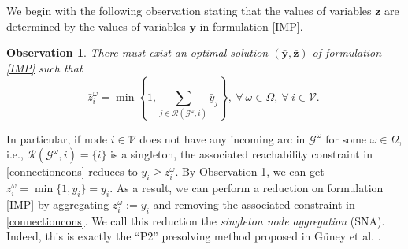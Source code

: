\documentclass[a4paper,10pt]{article}
\newcommand{\G}{\mathcal{G}}
\theoremstyle{plain}
\newtheorem{observation}[theorem]{Observation}
\begin{document}
	We begin with the following observation stating that the values of variables $\boldsymbol{z}$ are determined by the values of variables $\boldsymbol{y}$ in formulation \eqref{IMP}.
	\begin{observation}\label{projection_on_z}
		There must exist an optimal solution $(\bar{\boldsymbol{y}},\bar{\boldsymbol{z}})$ of formulation \eqref{IMP} such that
		\begin{equation}
			\bar{z}_i^{\omega}=\min\left\{1,\sum\limits_{j\in\mathcal{R}(\mathcal{G}^{\omega},i)}\bar{y}_j\right\},~ \forall~ \omega \in \Omega,~\forall~ i\in\mathcal{V}.~\label{projection_on_z_equation}
		\end{equation}
	\end{observation}
	\noindent In particular, if node $i\in\mathcal{V}$ does not have any incoming arc in $\mathcal{G}^{\omega}$ for some $\omega\in\Omega$, 
	i.e., $\mathcal{R}(\G^\omega , i)=\{i\}$ is a singleton,
	the associated reachability constraint in \eqref{connectioncons} reduces to $y_i\geq z_i^{\omega}$. By Observation \ref{projection_on_z}, we can get $z_i^{\omega}=\min\{1,y_i\}=y_i$.
	As a result, we can perform a reduction on formulation \eqref{IMP} by aggregating $z_i^\omega:=y_i$ and removing the associated constraint in \eqref{connectioncons}.
	We call this reduction the \emph{singleton node aggregation} (SNA).
	Indeed, this is exactly the ``P2'' presolving method proposed in G\"uney et al. \cite{Guney2020}. 
	
\end{document}
